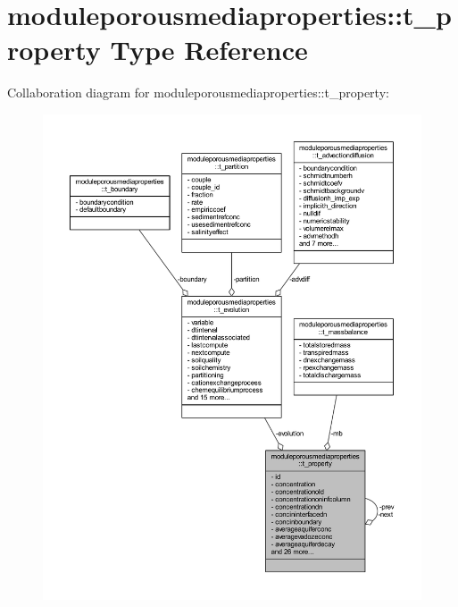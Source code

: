 \hypertarget{structmoduleporousmediaproperties_1_1t__property}{}\section{moduleporousmediaproperties\+:\+:t\+\_\+property Type Reference}
\label{structmoduleporousmediaproperties_1_1t__property}


Collaboration diagram for moduleporousmediaproperties\+:\+:t\+\_\+property\+:\nopagebreak
\begin{figure}[H]
\begin{center}
\leavevmode
\includegraphics[width=350pt]{structmoduleporousmediaproperties_1_1t__property__coll__graph}
\end{center}
\end{figure}
